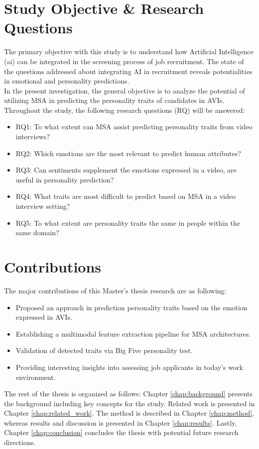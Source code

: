 \section{Study Objective \& Research Questions}
The primary objective with this study is to understand how Artificial Intelligence (\acrshort{ai}) can be integrated in the screening process of job recruitment. The state of the questions addressed about integrating AI in recruitment reveals potentialities in emotional and personality predictions. \\

In the present investigation, the general objective is to analyze the potential of utilizing MSA in predicting the personality traits of candidates in AVIs. Throughout the study, the following research questions (RQ) will be answered:
%
\begin{itemize}
    \item[] RQ1: To what extent can MSA assist predicting personality traits from video interviews? \\
    \item[] RQ2: Which emotions are the most relevant to predict human attributes? \\
    \item[] RQ3: Can sentiments supplement the emotions expressed in a video, are useful in personality prediction? \\
    \item[] RQ4: What traits are most difficult to predict based on MSA in a video interview setting?  \\
    \item[] RQ5: To what extent are personality traits the same in people within the same domain? \\
\end{itemize}

\section{Contributions}
The major contributions of this Master's thesis research are as following:
\begin{itemize}
    \item Proposed an approach in prediction personality traits based on the emotion expressed in AVIs. \\
    \item Establishing a multimodal feature extraction pipeline for MSA architectures. \\
    \item Validation of detected traits via Big Five personality test. \\
    \item Providing interesting insights into assessing job applicants in today's work environment. 
\end{itemize}
%
The rest of the thesis is organized as follows: Chapter \ref{chap:background} presents the background including key concepts for the study. Related work is presented in Chapter \ref{chap:related_work}. The method is described in Chapter \ref{chap:method}, whereas results and discussion is presented in Chapter \ref{chap:results}. Lastly, Chapter \ref{chap:conclusion} concludes the thesis with potential future research directions. 
